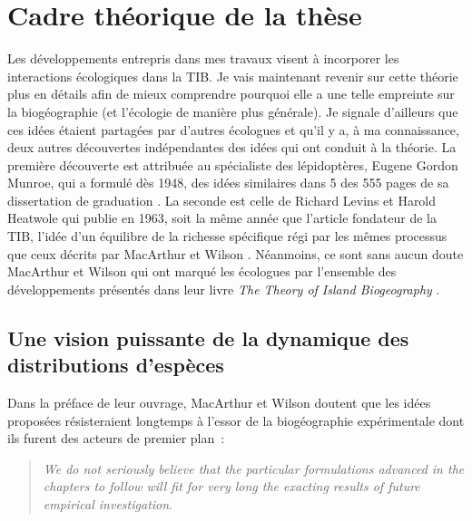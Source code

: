\section*{Cadre théorique de la
thèse}\label{cadre-thuxe9orique-de-la-thuxe8se}

Les développements entrepris dans mes travaux visent à incorporer les
interactions écologiques dans la TIB. Je vais maintenant revenir sur
cette théorie plus en détails afin de mieux comprendre pourquoi elle a
une telle empreinte sur la biogéographie (et l'écologie de manière plus
générale). Je signale d'ailleurs que ces idées étaient partagées par
d'autres écologues et qu'il y a, à ma connaissance, deux autres
découvertes indépendantes des idées qui ont conduit à la théorie. La
première découverte est attribuée au spécialiste des lépidoptères,
Eugene Gordon Munroe, qui a formulé dès 1948, des idées similaires dans
5 des 555 pages de sa dissertation de graduation
\citep{Brown1989, Lomolino2009}. La seconde est celle de Richard Levins
et Harold Heatwole qui publie en 1963, soit la même année que l'article
fondateur de la TIB, l'idée d'un équilibre de la richesse spécifique
régi par les mêmes processus que ceux décrits par MacArthur et Wilson
\citep{Levins1963}. Néanmoins, ce sont sans aucun doute MacArthur et
Wilson qui ont marqué les écologues par l'ensemble des développements
présentés dans leur livre \emph{The Theory of Island Biogeography}
\citep{MacArthur1967a}.

\subsection*{Une vision puissante de la dynamique des distributions
d'espèces}\label{une-vision-puissante-de-la-dynamique-des-distributions-despuxe8ces}

Dans la préface de leur ouvrage, MacArthur et Wilson doutent que les
idées proposées résisteraient longtemps à l'essor de la biogéographie
expérimentale dont ils furent des acteurs de premier plan~:

\begin{quote}
\emph{We do not seriously believe that the particular formulations
advanced in the chapters to follow will fit for very long the exacting
results of future empirical investigation}.
\end{quote}


